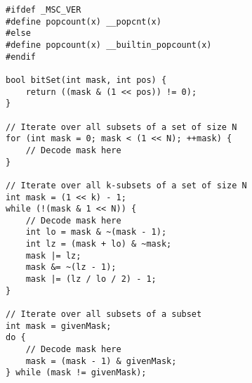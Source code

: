 \documentclass[a4paper]{article}
\begin{document}
	\begin{lstlisting}
#ifdef _MSC_VER
#define popcount(x) __popcnt(x)
#else
#define popcount(x) __builtin_popcount(x)
#endif

bool bitSet(int mask, int pos) {
	return ((mask & (1 << pos)) != 0);
}

// Iterate over all subsets of a set of size N
for (int mask = 0; mask < (1 << N); ++mask) {
	// Decode mask here
}

// Iterate over all k-subsets of a set of size N
int mask = (1 << k) - 1;
while (!(mask & 1 << N)) {
	// Decode mask here
	int lo = mask & ~(mask - 1);
	int lz = (mask + lo) & ~mask;
	mask |= lz;
	mask &= ~(lz - 1);
	mask |= (lz / lo / 2) - 1;
}

// Iterate over all subsets of a subset
int mask = givenMask;
do {
	// Decode mask here
	mask = (mask - 1) & givenMask;
} while (mask != givenMask);
	\end{lstlisting}
\end{document}
